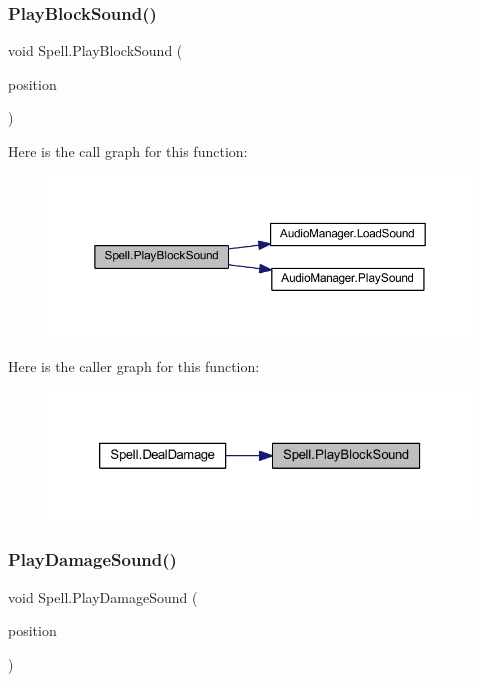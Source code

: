 \mbox{\label{class_spell_a14ec832bc720a2763ff8a09f81d7c5d4}} 
\subsubsection{\texorpdfstring{PlayBlockSound()}{PlayBlockSound()}}
{\footnotesize\ttfamily void Spell.\+Play\+Block\+Sound (\begin{DoxyParamCaption}\item[{Vector2\+Int}]{position }\end{DoxyParamCaption})}

Here is the call graph for this function\+:
\nopagebreak
\begin{figure}[H]
\begin{center}
\leavevmode
\includegraphics[width=350pt]{class_spell_a14ec832bc720a2763ff8a09f81d7c5d4_cgraph}
\end{center}
\end{figure}
Here is the caller graph for this function\+:
\nopagebreak
\begin{figure}[H]
\begin{center}
\leavevmode
\includegraphics[width=326pt]{class_spell_a14ec832bc720a2763ff8a09f81d7c5d4_icgraph}
\end{center}
\end{figure}
\mbox{\label{class_spell_a80aa52e9ed4b3555bd04682d93bc5049}} 
\subsubsection{\texorpdfstring{PlayDamageSound()}{PlayDamageSound()}}
{\footnotesize\ttfamily void Spell.\+Play\+Damage\+Sound (\begin{DoxyParamCaption}\item[{Vector2\+Int}]{position }\end{DoxyParamCaption})}

